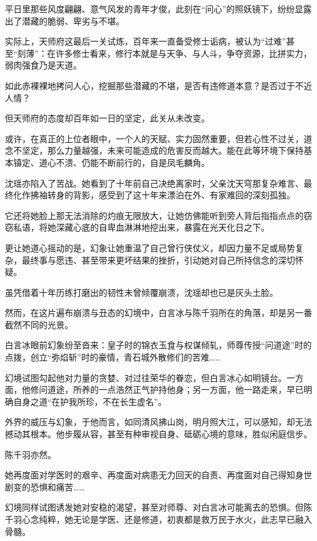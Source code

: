 平日里那些风度翩翩、意气风发的青年才俊，此刻在“问心”的照妖镜下，纷纷显露出了潜藏的脆弱、卑劣与不堪。

\vspace{2em}

实际上，天师府这最后一关试炼，百年来一直备受修士诟病，被认为“过难”甚至“刻薄”：在许多修士看来，修行本就是与天争、与人斗，争夺资源，比拼实力，弱肉强食乃是天道。

如此赤裸裸地拷问人心，挖掘那些潜藏的不堪，是否有违修道本意？是否过于不近人情？

但天师府的态度却百年如一日的坚定，此关从未改变。

或许，在真正的上位者眼中，一个人的天赋、实力固然重要，但若心性不过关，道念不坚定，那么力量越强，未来可能造成的危害反而越大。能在此等环境下保持基本镇定、道心不溃、仍能不断前行的，自是凤毛麟角。

\vspace{2em}

沈瑶亦陷入了苦战。她看到了十年前自己决绝离家时，父亲沈天穹那复杂难言、最终化作拂袖转身的背影，感受到了这十年来漂泊在外、有家难回的深刻孤独。

它还将她脸上那无法消除的灼痕无限放大，让她仿佛能听到旁人背后指指点点的窃窃私语，将她深藏心底的自卑血淋淋地挖出来，暴露在光天化日之下。

更让她道心摇动的是，幻象让她重温了自己曾行侠仗义，却因力量不足或局势复杂，最终事与愿违、甚至带来更坏结果的挫折，引动她对自己所持信念的深切怀疑。

虽凭借着十年历练打磨出的韧性未曾倾覆崩溃，沈瑶却也已是灰头土脸。

然而，在这片遍布崩溃与丑态的幻境中，白言冰与陈千羽所在的角落，却是另一番截然不同的光景。

白言冰眼前幻象纷至沓来：皇子时的锦衣玉食与权谋倾轧，师尊传授“问道途”时的点拨，创立“弥焰斩”时的豪情，青石城外散修们的苦难……

幻境试图勾起他对力量的贪婪、对过往荣华的眷恋，但白言冰心如明镜台。一方面，他修问道途，所养的一点浩然正气护持他身；另一方面，他一路走来，早已明确自身之道“在护我所珍，不在长生虚名”。

外界的威压与幻象，于他而言，如同清风拂山岗，明月照大江，可以感知，却无法撼动其根本。他步履从容，甚至有种审视自身、砥砺心境的意味，胜似闲庭信步。

陈千羽亦然。

她再度面对学医时的艰辛、再度面对病患无力回天的自责、再度面对自己得知身世剧变的恐惧和痛苦……

幻境同样试图诱发她对安稳的渴望，甚至对师尊、对白言冰可能离去的恐惧。但陈千羽心念纯粹，她无论是学医、还是修道，初衷都是救万民于水火，此志早已融入骨髓。

